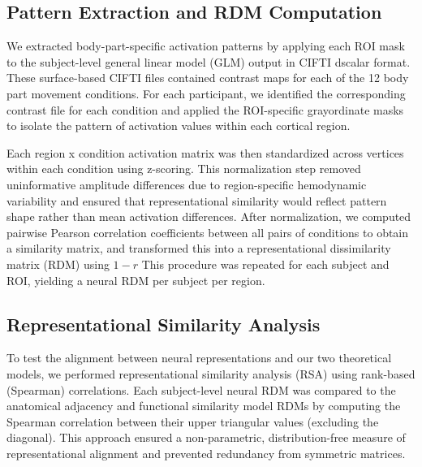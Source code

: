 \documentclass{article}
\begin{document}

\subsection{Pattern Extraction and RDM Computation}
We extracted body-part-specific activation patterns by applying each ROI mask to the subject-level general linear model (GLM) output in CIFTI dscalar format. These surface-based CIFTI files contained contrast maps for each of the 12 body part movement conditions. For each participant, we identified the corresponding contrast file for each condition and applied the ROI-specific grayordinate masks to isolate the pattern of activation values within each cortical region.

Each region x condition activation matrix was then standardized across vertices within each condition using z-scoring. This normalization step removed uninformative amplitude differences due to region-specific hemodynamic variability and ensured that representational similarity would reflect pattern shape rather than mean activation differences. After normalization, we computed pairwise Pearson correlation coefficients between all pairs of conditions to obtain a similarity matrix, and transformed this into a representational dissimilarity matrix (RDM) using $1-r$ This procedure was repeated for each subject and ROI, yielding a neural RDM per subject per region.

\subsection{Representational Similarity Analysis}
To test the alignment between neural representations and our two theoretical models, we performed representational similarity analysis (RSA) using rank-based (Spearman) correlations. Each subject-level neural RDM was compared to the anatomical adjacency and functional similarity model RDMs by computing the Spearman correlation between their upper triangular values (excluding the diagonal). This approach ensured a non-parametric, distribution-free measure of representational alignment and prevented redundancy from symmetric matrices.
\end{document}
